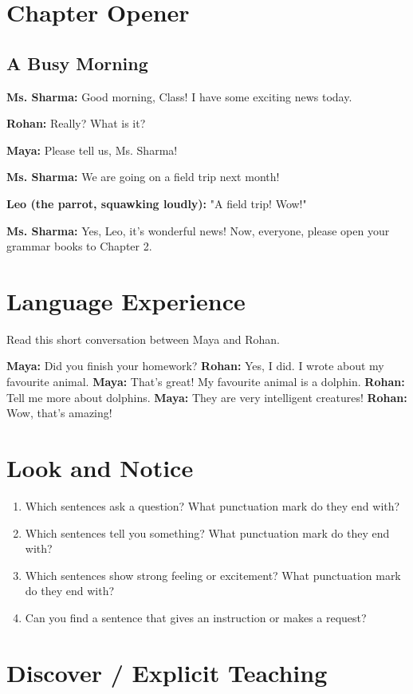 \section{Chapter Opener}
\subsection*{A Busy Morning}
\textbf{Ms. Sharma:} Good morning, Class! I have some exciting news today.

\textbf{Rohan:} Really? What is it?

\textbf{Maya:} Please tell us, Ms. Sharma!

\textbf{Ms. Sharma:} We are going on a field trip next month!

\textbf{Leo (the parrot, squawking loudly):} "A field trip! Wow!"

\textbf{Ms. Sharma:} Yes, Leo, it's wonderful news! Now, everyone, please open your grammar books to Chapter 2.

\section{Language Experience}
Read this short conversation between Maya and Rohan.

\textbf{Maya:} Did you finish your homework?
\textbf{Rohan:} Yes, I did. I wrote about my favourite animal.
\textbf{Maya:} That's great! My favourite animal is a dolphin.
\textbf{Rohan:} Tell me more about dolphins.
\textbf{Maya:} They are very intelligent creatures!
\textbf{Rohan:} Wow, that's amazing!

\section{Look and Notice}
\begin{enumerate}
    \item Which sentences ask a question? What punctuation mark do they end with?
    \item Which sentences tell you something? What punctuation mark do they end with?
    \item Which sentences show strong feeling or excitement? What punctuation mark do they end with?
    \item Can you find a sentence that gives an instruction or makes a request?
\end{enumerate}

\section{Discover / Explicit Teaching}
